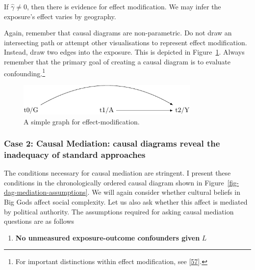 \documentclass[
  singlecolumn]{article}
\providecommand{\tightlist}{%
  \setlength{\itemsep}{0pt}\setlength{\parskip}{0pt}}\usepackage{longtable,booktabs,array}
\begin{document}
If \(\hat{\gamma}\neq 0\), then there is evidence for effect
modification. We may infer the exposure's effect varies by geography.

Again, remember that causal diagrams are non-parametric. Do not draw an
intersecting path or attempt other visualisations to represent effect
modification. Instead, draw two edges into the exposure. This is
depicted in Figure~\ref{fig-dag-effect-modfication}. Always remember
that the primary goal of creating a causal diagram is to evaluate
confounding.\footnote{For important distinctions within effect
  modification, see {[}\protect\hyperlink{ref-vanderweele2007}{57}{]}.}

\begin{figure}

{\centering \includegraphics[width=0.8\textwidth,height=\textheight]{causal-dags_files/figure-pdf/fig-dag-effect-modfication-1.pdf}

}

\caption{\label{fig-dag-effect-modfication}A simple graph for
effect-modification.}

\end{figure}

\hypertarget{case-2-causal-mediation-causal-diagrams-reveal-the-inadequacy-of-standard-approaches}{%
\subsubsection{Case 2: Causal Mediation: causal diagrams reveal the
inadequacy of standard
approaches}\label{case-2-causal-mediation-causal-diagrams-reveal-the-inadequacy-of-standard-approaches}}

The conditions necessary for causal mediation are stringent. I present
these conditions in the chronologically ordered causal diagram shown in
Figure~\ref{fig-dag-mediation-assumptions}. We will again consider
whether cultural beliefs in Big Gods affect social complexity. Let us
also ask whether this affect is mediated by political authority. The
assumptions required for asking causal mediation questions are as
follows

\begin{enumerate}
\def\labelenumi{\arabic{enumi}.}
\tightlist
\item
  \textbf{No unmeasured exposure-outcome confounders given} \(L\)
\end{enumerate}
\end{document}
